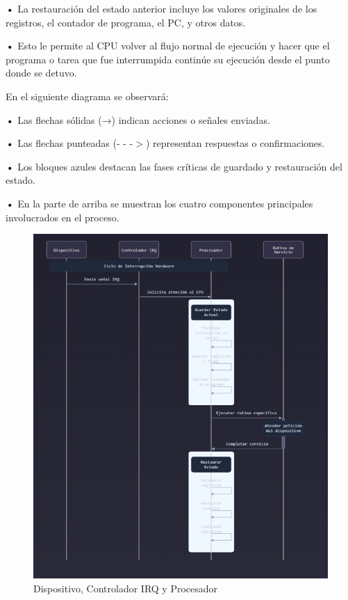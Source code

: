 \documentclass{article}
\begin{document}
\textbf{    •} { La restauración del estado anterior incluye los valores originales de los registros, el contador de programa, el PC, y otros datos.}

\textbf{    •} { Esto le permite al CPU volver al flujo normal de ejecución y hacer que el programa o tarea que fue interrumpida continúe su ejecución desde el punto donde se detuvo.}

\quad

{En el siguiente diagrama se observará:}

\quad

\textbf{    •} { Las flechas sólidas (→) indican acciones o señales enviadas.}

\textbf{    •} { Las flechas punteadas (- - -\(>\)) representan respuestas o confirmaciones.}

\textbf{    •} { Los bloques azules destacan las fases críticas de guardado y restauración del estado.}

\textbf{    •} { En la parte de arriba se muestran los cuatro componentes principales involucrados en el proceso.}


\begin{figure}[h]
    \centering
    \includegraphics[width=10cm\textwidth]{figura_01_(practica04).png}
    \caption{Dispositivo, Controlador IRQ y Procesador}
    \label{fig:img1}
\end{figure}

\quad

\quad
\newpage
\end{document}
